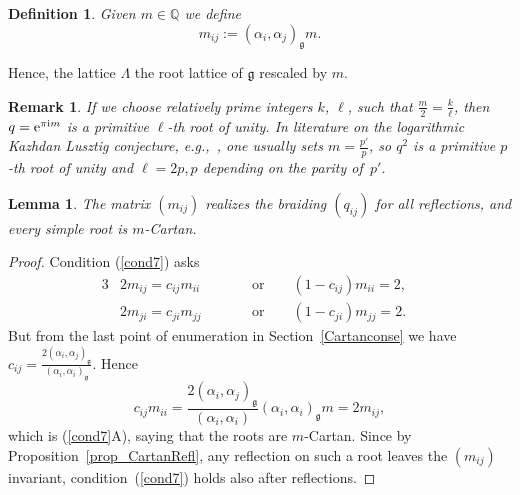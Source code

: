 \documentclass[pdftex]{sigma}%
\numberwithin{equation}{section}
\newtheorem{lem}[teo]{Lemma}
\newtheorem{defin}[teo]{Definition}
\newtheorem{oss}[teo]{Remark} }
\renewcommand{\i}{\mathrm{i}}
\begin{document}
\begin{defin}\label{mCartan}
Given $m \in \mathbb{Q}$ we define
\[m_{ij} := (\alpha_i, \alpha_j)_\mathfrak{g} m.\]
\end{defin}
Hence, the lattice $\Lambda$ the root lattice of $\mathfrak{g}$ rescaled by $m$.
\begin{oss} If we choose relatively prime integers $k$, $\ell$, such that $\frac{m}{2}= \frac{k}{\ell}$, then $q={\rm e}^{\pi\i m}$ is a primitive $\ell$-th root of unity. In literature on the logarithmic Kazhdan Lusztig conjecture, e.g.,~\cite{FT10, FGST06a}, one usually sets $m= \frac{p'}{p}$, so $q^2$ is a primitive $p$-th root of unity and $\ell=2p,p$ depending on the parity of~$p'$.
\end{oss}
\begin{lem}
The matrix $(m_{ij})$ realizes the braiding $(q_{ij})$ for all reflections, and every simple root is $m$-Cartan.
\end{lem}
\begin{proof}
Condition (\ref{cond7}) asks
\begin{alignat*}{3}
&2m_{ij} = c_{ij} m_{ii}\qquad && \text{or} \qquad (1-c_{ij})m_{ii} = 2,& \\
&2m_{ji} = c_{ji} m_{jj}\qquad && \text{or} \qquad (1-c_{ji})m_{jj} = 2.&
\end{alignat*} But from the last point of enumeration in Section~\ref{Cartanconse} we have $c_{ij} = \frac{2(\alpha_i, \alpha_j)_\mathfrak{g}}{(\alpha_i, \alpha_i)_\mathfrak{g}}$. Hence
\[
c_{ij}m_{ii} = \frac{2(\alpha_i, \alpha_j)_\mathfrak{g}}{(\alpha_i, \alpha_i)}(\alpha_i, \alpha_i)_\mathfrak{g} m = 2 m_{ij},
\] which is (\ref{cond7}A), saying that the roots are $m$-Cartan.
Since by Proposition~\ref{prop_CartanRefl}, any reflection on such a root leaves the $(m_{ij})$ invariant, condition~(\ref{cond7}) holds also after reflections.
\end{proof}
\end{document}
